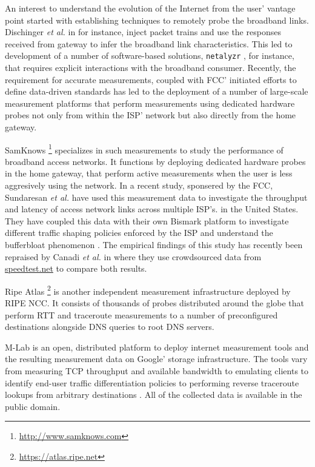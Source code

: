 An interest to understand the evolution of the Internet from the user' vantage
point started with establishing techniques to remotely probe the broadband
links. Dischinger \emph{et al.} in \cite{dischinger:2007} for instance, inject
packet trains and use the responses received from gateway to infer the
broadband link characteristics. This led to development of a number of
software-based solutions, \texttt{netalyzr} \cite{kreibich:2010}, for
instance, that requires explicit interactions with the broadband consumer.
Recently, the requirement for accurate measurements, coupled with \ac{FCC}'
initiated efforts to define data-driven standards has led to the deployment of
a number of large-scale measurement platforms that perform measurements using
dedicated hardware probes not only from within the \ac{ISP}' network but also
directly from the home gateway.

SamKnows \footnote{\url{http://www.samknows.com}} specializes in such
measurements to study the performance of broadband access networks. It
functions by deploying dedicated hardware probes in the home gateway, that
perform active measurements when the user is less aggresively using the
network. In a recent study, sponsered by the \ac{FCC}, Sundaresan \emph{et
al.} \cite{sundaresan:2011} have used this measurement data to investigate the
throughput and latency of access network links across multiple \ac{ISP}'s. in the
United States. They have coupled this data with their own Bismark platform
\cite{sundaresan:2012} to investigate different traffic shaping policies
enforced by the \ac{ISP} and understand the bufferbloat phenomenon
\cite{gettys:2012}. The empirical findings of this study has recently been
repraised by Canadi \emph{et al.} in \cite{canadi:2012} where they use
crowdsourced data from \url{speedtest.net} to compare both results.

Ripe Atlas \footnote{\url{https://atlas.ripe.net}} is another independent
measurement infrastructure deployed by \ac{RIPE NCC}. It consists of thousands
of probes distributed around the globe that perform \ac{RTT} and traceroute
measurements to a number of preconfigured destinations alongside DNS queries
to root DNS servers.

\ac{M-Lab} \cite{dovrolis:2010} is an open, distributed platform to deploy
internet measurement tools and the resulting measurement data on Google'
storage infrastructure. The tools vary from measuring TCP throughput and
available bandwidth to emulating clients to identify end-user traffic
differentiation policies \cite{dischinger:2010, kanuparthy:2011} to performing
reverse traceroute lookups from arbitrary destinations \cite{bassett:2010}.
All of the collected data is available in the public domain.

